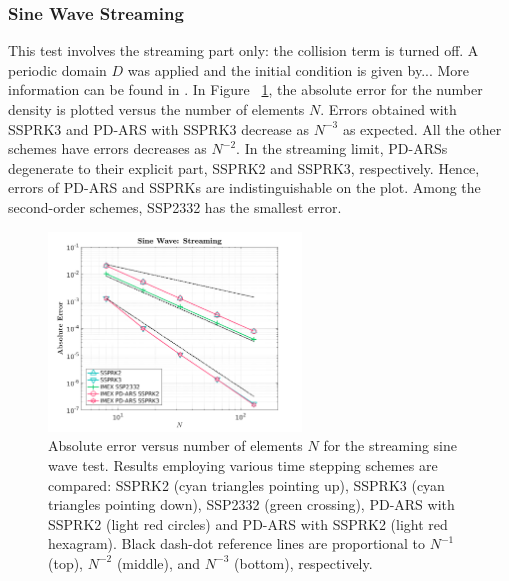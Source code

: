 \subsubsection{Sine Wave Streaming}
This test involves the streaming part only: the collision term is turned off. 
A periodic domain $D$ was applied and the initial condition is given by...
More information can be found in \cite{chu_etal_2018}.
In Figure ~\ref{fig: SineWaveStreaming}, the absolute error for the number density is plotted versus the number of elements $N$.
Errors obtained with SSPRK3 and PD-ARS with SSPRK3 decrease as $N^{-3}$ as expected.
All the other schemes have errors decreases as $N^{-2}$.
In the streaming limit, PD-ARSs degenerate to their explicit part, SSPRK2 and SSPRK3, respectively.
Hence, errors of PD-ARS and SSPRKs are indistinguishable on the plot.
Among the second-order schemes, SSP2332 has the smallest error.
\begin{figure}[h]
  \centering
    \includegraphics[width=0.6\textwidth]{figures/SineWaveStreaming}
   \caption{Absolute error versus number of elements $N$ for the streaming sine wave test.  Results employing various time stepping schemes are compared: SSPRK2 (cyan triangles pointing up), SSPRK3 (cyan triangles pointing down), SSP2332 (green crossing), PD-ARS with SSPRK2 (light red circles) and PD-ARS with SSPRK2 (light red hexagram). Black dash-dot reference lines are proportional to $N^{-1}$ (top), $N^{-2}$ (middle), and $N^{-3}$ (bottom), respectively.}
   \label{fig: SineWaveStreaming}
\end{figure}

